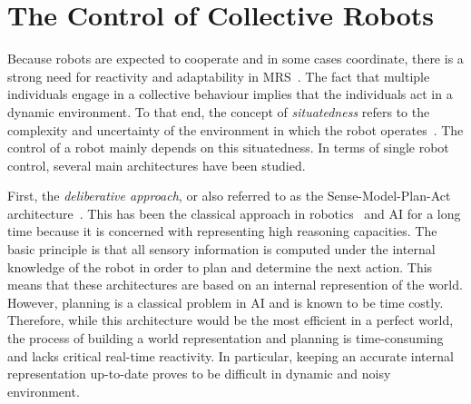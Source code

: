 

\section{The Control of Collective Robots}

  Because robots are expected to cooperate and in some cases coordinate, there is a strong need for reactivity and adaptability in MRS~\parencite{Iocchi2001, Farinelli2004}. The fact that multiple individuals engage in a collective behaviour implies that the individuals act in a dynamic environment. To that end, the concept of \emph{situatedness} refers to the complexity and uncertainty of the environment in which the robot operates~\parencite{Mataric2008}. The control of a robot mainly depends on this situatedness. In terms of single robot control, several main architectures have been studied.

  First, the \emph{deliberative approach}, or also referred to as the Sense-Model-Plan-Act architecture~\parencite{Albus1991, Iocchi2001, Mataric2008}. This has been the classical approach in robotics~\parencite{Nilsson1984} and AI for a long time because it is concerned with representing high reasoning capacities. The basic principle is that all sensory information is computed under the internal knowledge of the robot in order to plan and determine the next action. This means that these architectures are based on an internal represention of the world. However, planning is a classical problem in AI and is known to be time costly. Therefore, while this architecture would be the most efficient in a perfect world, the process of building a world representation and planning is time-consuming and lacks critical real-time reactivity. In particular, keeping an accurate internal representation up-to-date proves to be difficult in dynamic and noisy environment.


